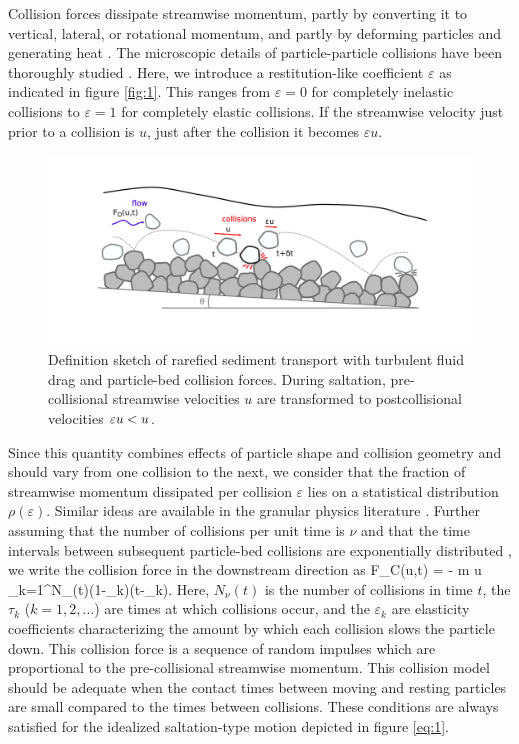 Collision forces dissipate streamwise momentum, partly by converting it to vertical, lateral, or rotational momentum, and partly by deforming particles and generating heat \citep{Williams2020}.
The microscopic details of particle-particle collisions have been thoroughly studied \citep{Brach1989, Lorenz1997,Montaine2011}. Here, we introduce a restitution-like coefficient $\varepsilon$ as indicated in figure \ref{fig:1}. This ranges from $\varepsilon=0$ for completely inelastic collisions to $\varepsilon=1$ for completely elastic collisions.
If the streamwise velocity just prior to a collision is $u$, just after the collision it becomes $\varepsilon u$. 
\begin{figure}
	\centerline{\includegraphics{./figures/ch5/Fig1Concept.png}}
	\caption{Definition sketch of rarefied sediment transport with turbulent fluid drag and particle-bed collision forces. During saltation, pre-collisional streamwise velocities $u$ are transformed to postcollisional velocities $\varepsilon u < u$.}
	\label{fig:fig1}
\end{figure}
Since this quantity combines effects of particle shape and collision geometry and should vary from one collision to the next, we consider that the fraction of streamwise momentum dissipated per collision $\varepsilon$ lies on a statistical distribution $\rho(\varepsilon)$.
Similar ideas are available in the granular physics literature \citep{Serrero2015}.
Further assuming that the number of collisions per unit time is $\nu$ and that the time intervals between subsequent particle-bed collisions are exponentially distributed \citep{Gordon1972}, we write the collision force in the downstream direction as
\be F_C(u,t) = - m u \sum_{k=1}^{N_\nu(t)}(1-\varepsilon_k)\delta(t-\tau_k). \label{eq:col} \ee
Here, $N_\nu(t)$ is the number of collisions in time $t$, the $\tau_k$ ($k=1,2,\dots$) are times at which collisions occur, and the $\varepsilon_k$ are elasticity coefficients characterizing the amount by which each collision slows the particle down.
This collision force is a sequence of random impulses which are proportional to the pre-collisional streamwise momentum. This collision model should be adequate when the contact times between moving and resting particles are small compared to the times between collisions. These conditions are always satisfied for the idealized saltation-type motion depicted in figure \ref{eq:1}.

